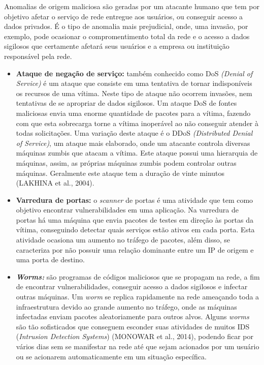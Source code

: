 \documentclass[12pt,openright,oneside,a4paper,english,spanish,brazil]{unifil}
\begin{document}
  \indent Anomalias de origem maliciosa são geradas por um atacante humano que tem por objetivo afetar o serviço de rede entregue aos usuários, ou conseguir acesso a dados privados. É o tipo de anomalia mais prejudicial, onde, uma invasão, por exemplo, pode ocasionar o compromentimento total da rede e o acesso a dados sigilosos que certamente afetará seus usuários e a empresa ou instituição responsável pela rede.
  \begin{itemize} 
  \item \textbf{Ataque de negação de serviço:} também conhecido como DoS \textit{(Denial of Service)} é um ataque que consiste em uma tentativa de tornar indisponíveis os recursos de uma vítima. Neste tipo de ataque não ocorrem invasões, nem tentativas de se apropriar de dados sigilosos. Um ataque DoS de fontes maliciosas envia uma enorme quantidade de pacotes para a vítima, fazendo com que esta sobrecarga  torne a vítima inoperável ao não conseguir atender à todas solicitações. Uma variação deste ataque é o DDoS \textit{(Distributed Denial of Service)}, um ataque mais elaborado, onde um atacante controla diversas máquinas zumbis que atacam a vítima. Este ataque possui uma hierarquia de máquinas, assim, as próprias máquinas zumbis podem controlar outras máquinas. Geralmente este ataque tem a duração de vinte minutos (LAKHINA et al., 2004).
  \item \textbf{Varredura de portas:} o \textit{scanner} de portas é uma atividade que tem como objetivo encontrar vulnerabilidades em uma aplicação. Na varredura de portas há uma máquina que envia pacotes de testes em direção às portas da vítima, conseguindo detectar quais serviços estão ativos em cada porta. Esta atividade ocasiona um aumento no tráfego de pacotes, além disso, se caracteriza por não possuir uma relação dominante entre um IP de origem e uma porta de destino. 
  \item \textbf{\textit{Worms:}} são programas de códigos maliciosos que se propagam na rede, a fim de encontrar vulnerabilidades, conseguir acesso a dados sigilosos e infectar outras máquinas. Um \textit{worm} se replica rapidamente na rede ameaçando toda a infraestrutura devido ao grande aumento no tráfego, onde as máquinas infectadas enviam pacotes aleatoriamente para outros alvos. Alguns \textit{worms} são tão sofisticados que conseguem esconder suas atividades de muitos IDS (\textit{Intrusion Detection Systems}) (MONOWAR et al., 2014), podendo ficar por vários dias sem se manifestar na rede até que sejam acionados por um usuário ou se acionarem automaticamente em um situação específica.

\end{itemize}
\end{document}
